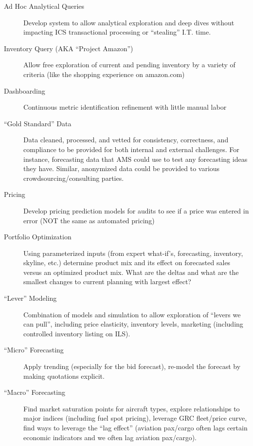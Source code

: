 \documentclass[letterpaper]{article}
\begin{document}
    \begin{description}

    \item[Ad Hoc Analytical Queries]
        Develop system to allow analytical exploration and deep dives without
        impacting ICS transactional processing or ``stealing'' I.T. time.

    \item[Inventory Query (AKA ``Project Amazon'')]
        Allow free exploration of current and pending inventory by a variety of
        criteria (like the shopping experience on amazon.com)

    \item[Dashboarding]
        Continuous metric identification refinement with little manual labor

    \item[``Gold Standard'' Data]
        Data cleaned, processed, and vetted for consistency, correctness, and
        compliance to be provided for both internal and external challenges.  For
        instance, forecasting data that AMS could use to test any forecasting
        ideas they have.  Similar, anonymized data could be provided to various
        crowdsourcing/consulting parties.

    \item[Pricing]
        Develop pricing prediction models for audits to see if a price was entered
        in error (NOT the same as automated pricing)

    \item[Portfolio Optimization]
        Using parameterized inputs (from expert what-if's, forecasting, inventory,
        skyline, etc.) determine product mix and its effect on forecasted sales
        versus an optimized product mix.  What are the deltas and what are the
        smallest changes to current planning with largest effect?

    \item[``Lever'' Modeling]
        Combination of models and simulation to allow exploration of ``levers
        we can pull'', including price elasticity, inventory levels, marketing
        (including controlled inventory listing on ILS).

    \item[``Micro'' Forecasting]
        Apply trending (especially for the bid forecast), re-model the forecast by
        making quotations explicit.

    \item[``Macro'' Forecasting]
        Find market saturation points for aircraft types, explore relationships to
        major indices (including fuel spot pricing), leverage GRC fleet/price
        curve, find ways to leverage the ``lag effect'' (aviation pax/cargo often
        lags certain economic indicators and we often lag aviation pax/cargo).


\end{description}
\end{document}
